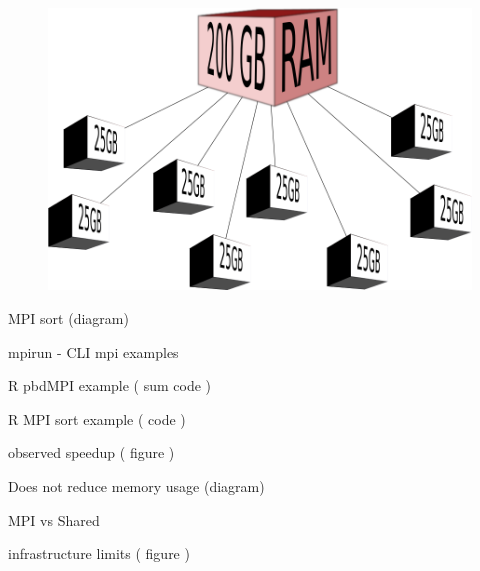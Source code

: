 \begin{frame}
		\begin{figure}
				\includegraphics[width=0.8\linewidth]{figures/diagrams/splitmem/memsplit}
		\end{figure}
\end{frame}

\begin{frame}
		MPI sort (diagram)
\end{frame}

\begin{frame}
		mpirun - CLI mpi examples
\end{frame}

\begin{frame}
		R pbdMPI example ( sum code )
\end{frame}

\begin{frame}
		R MPI sort example ( code )
\end{frame}

\begin{frame}
		observed speedup ( figure )
\end{frame}

\begin{frame}
		Does not reduce memory usage (diagram)
\end{frame}

\begin{frame}
		MPI vs Shared
\end{frame}

\begin{frame}
		infrastructure limits ( figure )
\end{frame}


